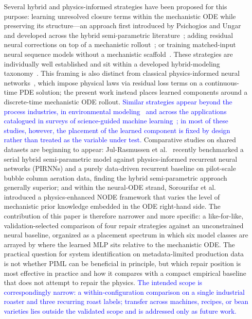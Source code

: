 \documentclass[fleqn,10pt]{wlscirep}
\newcommand{\rev}[1]{\textcolor{blue}{#1}}
\begin{document}
Several hybrid and physics-informed strategies have been proposed for this purpose: learning unresolved closure terms within the mechanistic ODE while preserving its structure---an approach first introduced by Psichogios and Ungar~\cite{psichogios1992} and developed across the hybrid semi-parametric literature~\cite{vonStosch2014,karniadakis2021,rackauckas2020universal}; adding residual neural corrections on top of a mechanistic rollout~\cite{kennedy2001bayesian,vonStosch2014}; or training matched-input neural sequence models without a mechanistic scaffold~\cite{ljung1999,pillonetto2025}. These strategies are individually well established and sit within a developed hybrid-modeling taxonomy~\cite{vonStosch2014,sansana2021,sharma2022,rajulapati2022,schweidtmann2024}. This framing is also distinct from classical physics-informed neural networks~\cite{raissi2019}, which impose physical laws via residual loss terms on a continuous-time PDE solution; the present work instead places learned components around a discrete-time mechanistic ODE rollout. \rev{Similar strategies appear beyond the process industries, in environmental modeling~\cite{read2019} and across the applications catalogued in surveys of science-guided machine learning~\cite{willard2022}; in most of these studies, however, the placement of the learned component is fixed by design rather than treated as the variable under test.} Comparative studies on shared datasets are beginning to appear: Jul-Rasmussen et al.~\cite{julrasmussen2025} recently benchmarked a serial hybrid semi-parametric model against physics-informed recurrent neural networks (PIRNNs) and a purely data-driven recurrent baseline on pilot-scale bubble column aeration data, finding the hybrid semi-parametric approach generally superior; and within the neural-ODE strand, Sorourifar et al.~\cite{sorourifar2023} introduced a physics-enhanced NODE framework that varies the level of mechanistic prior knowledge embedded in the ODE right-hand side. The contribution of this paper is therefore narrower and more specific: a like-for-like, validation-selected comparison of four repair strategies against an unconstrained neural baseline, organized as a placement spectrum in which six model classes are arrayed by where the learned MLP sits relative to the mechanistic ODE. The practical question for system identification on metadata-limited production data is not whether PIML can be beneficial in principle, but which repair position is most effective in practice and how it compares with a compact empirical baseline that does not attempt to repair the physics. \rev{The intended scope is correspondingly narrow: a within-configuration comparison on a single industrial roaster and three recurring roast labels; transfer across machines, recipes, or bean varieties lies outside the validated scope and is addressed only as future work.}
\end{document}
